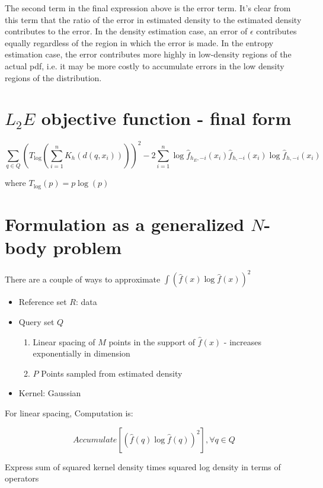 \documentclass{article}
\begin{document}
The second term in the final expression above is the error term. It's clear from this term that the ratio of the error in estimated density to the estimated density contributes to the error. In the density estimation case, an error of $ \epsilon $ contributes equally regardless of the region in which the error is made. In the entropy estimation case, the error contributes more highly in low-density regions of the actual pdf, i.e. it may be more costly to accumulate errors in the low density regions of the distribution.


\section{$L_2E$ objective function - final form}

\begin{displaymath}
\sum_{q \in Q} \left( T_{\log} \left( \sum_{i=1}^n K_h(d(q,x_i)) \right) \right) ^2 - 2 \sum_{i=1}^n \log \hat{f}_{h_E,-i}(x_i) \hat{f}_{h,-i}(x_i) \log \hat{f}_{h,-i}(x_i)
\end{displaymath}

where $ T_{\log}(p) = p \log(p) $


\section{Formulation as a generalized $N$-body problem}

There are a couple of ways to approximate $ \int (\hat{f}(x) \log \hat{f}(x))^2  $
\begin{itemize}
\item Reference set $R$: data
\item Query set $Q$
  \begin{enumerate}
    \item Linear spacing of $M$ points in the support of $ \hat{f}(x) $ - increases exponentially in dimension
    \item $P$ Points sampled from estimated density
      \end{enumerate}
  \item Kernel: Gaussian
\end{itemize}

For linear spacing, Computation is:

\begin{displaymath}
Accumulate[(\hat{f}(q) \log \hat{f}(q))^2] , \forall q \in Q 
\end{displaymath}

Express sum of squared kernel density times squared log density in terms of operators
\end{document}
